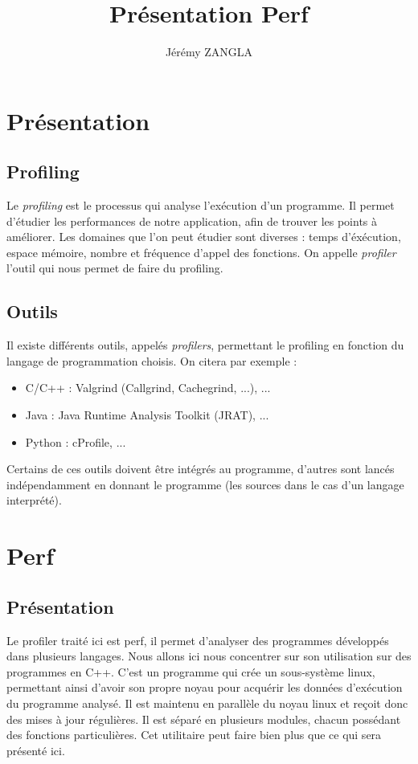\documentclass[a4paper]{article}
\title{Présentation Perf}
\author{Jérémy ZANGLA}
\begin{document}
\maketitle
\pagebreak
\tableofcontents
\pagebreak
\section{Présentation}
\subsection{Profiling}
    Le \emph{profiling} est le processus qui analyse l'exécution d'un programme.
    Il permet d'étudier les performances de notre application, afin de trouver les points à améliorer.
    Les domaines que l'on peut étudier sont diverses : temps d'éxécution, espace mémoire, nombre et fréquence d'appel des fonctions.
    On appelle \emph{profiler} l'outil qui nous permet de faire du profiling.
\subsection{Outils}
    Il existe différents outils, appelés \emph{profilers}, permettant le profiling en fonction du langage de programmation choisis. On citera par exemple : 
    \begin{itemize}
        \item C/C++ : Valgrind (Callgrind, Cachegrind, ...), ...
        \item Java : Java Runtime Analysis Toolkit (JRAT), ...
        \item Python : cProfile, ...
    \end{itemize}
    Certains de ces outils doivent être intégrés au programme, d'autres sont lancés indépendamment en donnant le programme (les sources dans le cas d'un langage interprété).
\section{Perf}
\subsection{Présentation}Le profiler traité ici est perf, il permet d'analyser des programmes développés dans plusieurs langages. Nous allons ici nous concentrer sur son utilisation sur des programmes en C++.
    C'est un programme qui crée un sous-système linux, permettant ainsi d'avoir son propre noyau pour acquérir les données d'exécution du programme analysé. Il est maintenu en parallèle du noyau linux et reçoit donc des mises à jour régulières.
    Il est séparé en plusieurs modules, chacun possédant des fonctions particulières. Cet utilitaire peut faire bien plus que ce qui sera présenté ici.
\end{document}
